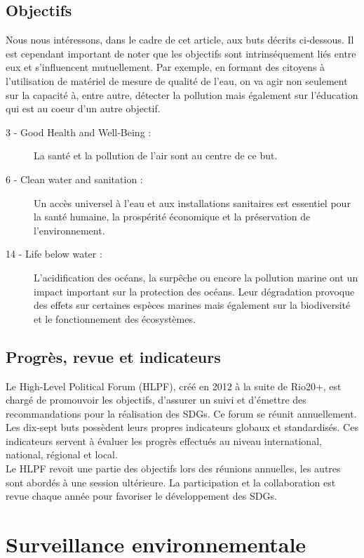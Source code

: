 \documentclass[10pt, article]{llncs}
\begin{document}
		\subsection{Objectifs}
			Nous nous intéressons, dans le cadre de cet article, aux buts décrits ci-dessous. Il est cependant important de noter que les objectifs sont intrinséquement liés entre eux et s'influencent mutuellement. Par exemple, en formant des citoyens à l'utilisation de matériel de mesure de qualité de l'eau, on va agir non seulement sur la capacité à, entre autre, détecter la pollution mais également sur l'éducation qui est au coeur d'un autre objectif.
			\begin{description}
				\item[ 3 - Good Health and Well-Being :] La santé et la pollution de l'air sont au centre de ce but.
				\item[ 6 - Clean water and sanitation :] Un accès universel à l'eau et aux installations sanitaires est essentiel pour la santé humaine, la prospérité économique et la préservation de l'environnement.
				\item[14 - Life below water :] L'acidification des océans, la surpêche ou encore la pollution marine ont un impact important sur la protection des océans. Leur dégradation provoque des effets sur certaines espèces marines mais également sur la biodiversité et le fonctionnement des écosystèmes.
			\end{description}				
		
		\subsection{Progrès, revue et indicateurs}
			Le High-Level Political Forum (HLPF), créé en 2012 à la suite de Rio20+, est chargé de promouvoir les objectifs, d'assurer un suivi et d'émettre des recommandations pour la réalisation des SDGs. Ce forum se réunit annuellement. \\
			Les dix-sept buts possèdent leurs propres indicateurs globaux et standardisés. Ces indicateurs servent à évaluer les progrès effectués au niveau international, national, régional et local. \\
			Le HLPF revoit une partie des objectifs lors des réunions annuelles, les autres sont abordés à une session ultérieure. La participation et la collaboration est revue chaque année pour favoriser le développement des SDGs.\cite{united_nations_high-level_nodate}

\section{Surveillance environnementale}
\end{document}
